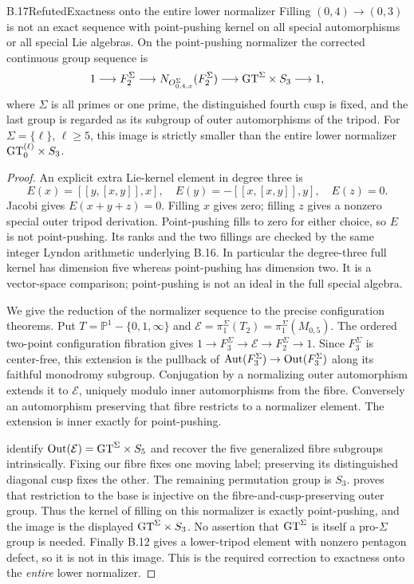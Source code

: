 \begin{statement}{B.17}{Refuted}{Exactness onto the entire lower normalizer}
Filling $(0,4)\to(0,3)$ is not an exact sequence with
point-pushing kernel on all special automorphisms or
all special Lie algebras. On the point-pushing
normalizer the corrected continuous group sequence is
\[
 1\longrightarrow F_2^\Sigma\longrightarrow
 N_{O_{0,4,x}^\Sigma}(F_2^\Sigma)
 \longrightarrow \mathrm{GT}^\Sigma\times S_3\longrightarrow1,
\]
where $\Sigma$ is all primes or one prime, the
distinguished fourth cusp is fixed, and the last group
is regarded as its subgroup of outer automorphisms of
the tripod. For $\Sigma=\{\ell\}$, $\ell\ge5$, this
image is strictly smaller than the entire lower
normalizer $\mathrm{GT}_0^{(\ell)}\times S_3$.
\end{statement}
\begin{proof}
An explicit extra Lie-kernel element in degree three is
\[
 E(x)=[[y,[x,y]],x],\quad
 E(y)=-[[x,[x,y]],y],\quad E(z)=0.
\]
Jacobi gives $E(x+y+z)=0$. Filling $x$ gives zero;
filling $z$ gives a nonzero special outer tripod
derivation. Point-pushing fills to zero for either
choice, so $E$ is not point-pushing. Its ranks and
the two fillings are checked by the same integer
Lyndon arithmetic underlying B.16. In particular the
degree-three full kernel has dimension five whereas
point-pushing has dimension two. It is a vector-space
comparison; point-pushing is not an ideal in the full
special algebra.

We give the reduction of the normalizer sequence to
the precise configuration theorems. Put
$T=\mathbb P^1-\{0,1,\infty\}$ and
$\mathcal E=\pi_1^\Sigma(T_2)=\pi_1^\Sigma(M_{0,5})$.
The ordered two-point configuration fibration gives
$1\to F_3^\Sigma\to\mathcal E\to F_2^\Sigma\to1$.
Since $F_3^\Sigma$ is center-free, this extension is
the pullback of
$\operatorname{Aut}(F_3^\Sigma)\to\operatorname{Out}(F_3^\Sigma)$ along its
faithful monodromy subgroup. Conjugation by a
normalizing outer automorphism extends it to
$\mathcal E$, uniquely modulo inner automorphisms
from the fibre. Conversely an automorphism preserving
that fibre restricts to a normalizer element.
The extension is inner exactly for point-pushing.

\citet[Corollaries 2.6(i), 2.8(i) and Definition 2.7]{HoshiMinamideMochizuki2022}
identify $\operatorname{Out}(\mathcal E)=\mathrm{GT}^\Sigma\times S_5$
and recover the five generalized fibre subgroups
intrinsically. Fixing our fibre fixes one moving
label; preserving its distinguished diagonal cusp
fixes the other. The remaining permutation group is
$S_3$. \citet[Theorem 6.1, $n=1$]{HoshiMochizuki2011}
proves that restriction to the base is injective on
the fibre-and-cusp-preserving outer group. Thus the
kernel of filling on this normalizer is exactly
point-pushing, and the image is the displayed
$\mathrm{GT}^\Sigma\times S_3$. No assertion that
$\mathrm{GT}^\Sigma$ is itself a pro-$\Sigma$ group is needed.
Finally B.12 gives a lower-tripod element with
nonzero pentagon defect, so it is not in this image.
This is the required correction to exactness onto
the \emph{entire} lower normalizer.
\end{proof}

